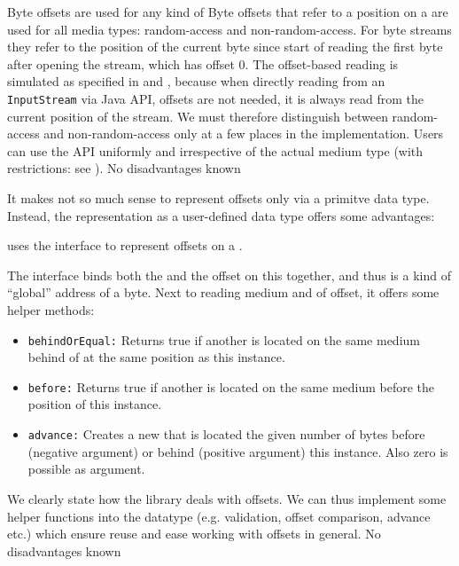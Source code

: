 {%
Byte offsets are used for any kind of \TERMmedia{}
}
{%
Byte offsets that refer to a position on a \TERMmedium{} are used for all media types: random-access and non-random-access. For byte streams they refer to the position of the current byte since start of reading the first byte after opening the stream, which has offset 0. The offset-based reading is simulated as specified in  and , because when directly reading from an \texttt{InputStream} via Java API, offsets are not needed, it is always read from the current position of the stream. 
}
{%
We must therefore distinguish between random-access and non-random-access only at a few places in the implementation. Users can use the API uniformly and irrespective of the actual medium type (with restrictions: see ).
}
{%
No disadvantages known
}

It makes not so much sense to represent offsets only via a primitve data type. Instead, the representation as a user-defined data type offers some advantages:

{%
\LibName{} uses the interface \IMediumReference{} to represent offsets on a \TERMmedium{}.
}
{%
The interface binds both the \TERMmedium{} and the offset on this \TERMmedium{} together, and thus is a kind of ``global'' address of a byte. Next to reading medium and of offset, it offers some helper methods:
\begin{itemize}
\item \texttt{behindOrEqual:} Returns true if another \IMediumReference{} is located on the same medium behind of at the same position as this instance.
\item \texttt{before:} Returns true if another \IMediumReference{} is located on the same medium before the position of this instance.
\item \texttt{advance:} Creates a new \IMediumReference{} that is located the given number of bytes before (negative argument) or behind (positive argument) this instance. Also zero is possible as argument.
\end{itemize}
}
{%
We clearly state how the library deals with offsets. We can thus implement some helper functions into the datatype (e.g. validation, offset comparison, advance etc.) which ensure reuse and ease working with offsets in general.
}
{%
No disadvantages known
}

